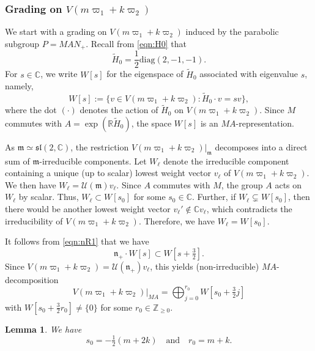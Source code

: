 \documentclass[reqno,11pt]{amsart}
\newtheorem{lem}[equation]{Lemma}
\theoremstyle{remark}
\numberwithin{equation}{section}
\newcommand{\fm}{{\mathfrak m}}
\newcommand{\fn}{{\mathfrak n}}
\newcommand{\f}{\mathfrak}
\newcommand{\R}{\mathbb{R}}
\newcommand{\C}{\mathbb{C}}
\newcommand{\Z}{\mathbb{Z}}
\newcommand{\Cal}{\mathcal}
\newcommand{\wH}{\widetilde{H}}
\newcommand{\diag}{\mathrm{diag}}
\begin{document}
\subsubsection{Grading on $V(m\varpi_1+k\varpi_2)$}
\label{sec:grading}
We start with a grading on $V(m\varpi_1+k\varpi_2)$ induced by the
parabolic subgroup $P=MAN_+$. Recall from \eqref{eqn:H0} that 
\begin{equation}\label{eqn:H02}
\wH_0=\frac{1}{2}\diag(2, -1, -1).
\end{equation}
For $s \in \C$, we write $W[s]$ for the eigenspace of $\wH_0$ associated 
with eigenvalue $s$, namely,
\begin{equation*}
W[s] := \{v \in V(m\varpi_1 + k \varpi_2) : \wH_0 \cdot v = sv\},
\end{equation*}
where the dot $(\cdot)$ denotes the action of $\wH_0$ on 
$V(m\varpi_1 + k \varpi_2)$. Since $M$ commutes with $A=\exp(\R \wH_0)$, 
the space $W[s]$ is an $MA$-representation.

As $\fm\simeq \f{sl}(2,\C)$, the restriction 
$V(m\varpi_1 + k \varpi_2)\vert_{\fm}$ decomposes into a direct sum of 
$\fm$-irreducible components.
Let $W_\ell$ denote the irreducible component containing
a unique (up to scalar) lowest weight vector $v_{\ell}$ of $V(m\varpi_1 + k \varpi_2)$.
We then have  $W_\ell =\Cal{U}(\fm)v_\ell$.
Since $A$ commutes with $M$, the group $A$ acts on $W_\ell$ by scalar. 
Thus, $W_\ell \subset W[s_0]$ for some $s_0 \in \C$. Further, if 
$W_\ell \subsetneq W[s_0]$, then there would be another lowest weight vector
$v_\ell' \notin \C v_\ell$, which contradicts the irreducibility of $V(m\varpi_1+k\varpi_2)$. Therefore, we have $W_\ell=W[s_0]$.

It  follows from \eqref{eqn:nR1} that we have
\begin{equation}\label{eqn:n+}
\fn_+ \cdot W[s] \subset W[s+\tfrac{3}{2}]. 
\end{equation}
Since $V(m\varpi_1 + k \varpi_2)=\Cal{U}(\fn_+)v_{\ell}$, this yields
(non-irreducible)
$MA$-decomposition
\begin{equation*}
V(m\varpi_1 + k \varpi_2)\vert_{MA}
=\bigoplus_{j=0}^{r_0}W[s_0+\tfrac{3}{2}j]
\end{equation*}
with 
$W[s_0+\tfrac{3}{2}r_0] \neq \{0\}$ for some $r_0 \in \Z_{\geq 0}$.


\begin{lem}\label{lem:rs}
We have
\begin{equation*}
s_0=-\tfrac{1}{2}(m+2k)
\quad
\text{and}
\quad
r_0=m+k.
\end{equation*}
\end{lem}
\end{document}
